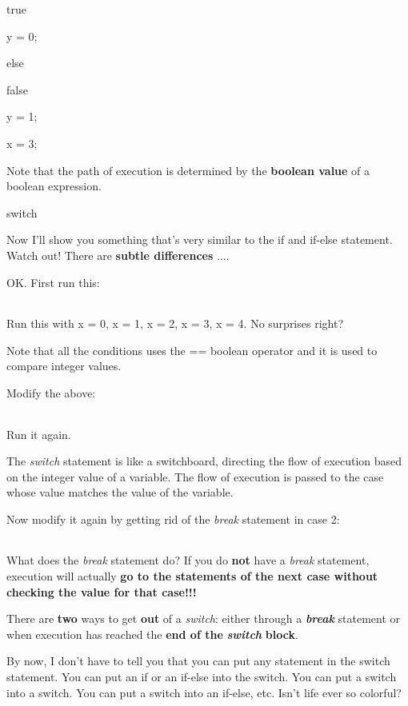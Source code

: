 \documentclass[
]{article}
\begin{document}
true

y = 0;

else

false

y = 1;

x = 3;

Note that the path of execution is determined by the \textbf{boolean
value} of a boolean expression.

switch

Now I'll show you something that's very similar to the if and if-else
statement. Watch out! There are \textbf{subtle differences} ....

OK. First run this:

\begin{longtable}[]{@{}@{}}
\toprule
\endhead
\bottomrule
\end{longtable}

Run this with x = 0, x = 1, x = 2, x = 3, x = 4. No surprises right?

Note that all the conditions uses the == boolean operator and it is used
to compare integer values.

Modify the above:

\begin{longtable}[]{@{}@{}}
\toprule
\endhead
\bottomrule
\end{longtable}

Run it again.

The \emph{switch} statement is like a switchboard, directing the flow of
execution based on the integer value of a variable. The flow of
execution is passed to the case whose value matches the value of the
variable.

Now modify it again by getting rid of the \emph{break} statement in case
2:

\begin{longtable}[]{@{}@{}}
\toprule
\endhead
\bottomrule
\end{longtable}

What does the \emph{break} statement do? If you do \textbf{not} have a
\emph{break} statement, execution will actually \textbf{go to the
statements of the next case without checking the value for that case!!!}

There are \textbf{two} ways to get \textbf{out} of a \emph{switch}:
either through a \emph{\textbf{break}} statement or when execution has
reached the \textbf{end of the }\emph{\textbf{switch}}\textbf{ block}.

By now, I don't have to tell you that you can put any statement in the
switch statement. You can put an if or an if-else into the switch. You
can put a switch into a switch. You can put a switch into an if-else,
etc. Isn't life ever so colorful?
\end{document}
